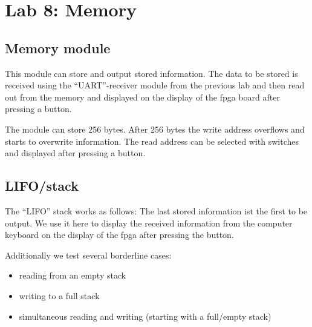 \chapter{Lab 8: Memory} \label{day8}

\section{Memory module}

This module can store and output stored information. The data to be stored is received using the ``UART''-receiver module from the previous lab and then read out from the memory and displayed on the display of the \gls{fpga} board after pressing a button. 

The module can store 256 bytes. After 256 bytes the write address overflows and starts to overwrite information. The read address can be selected with switches and displayed after pressing a button.





\section{LIFO/stack}

The ``LIFO'' stack works as follows: The last stored information ist the first to be output. We use it here to display the received information from the computer keyboard on the display of the \gls{fpga} after pressing the button.





Additionally we test several borderline cases: 

\begin{itemize}
    \item reading from an empty stack
    \item writing to a full stack
    \item simultaneous reading and writing (starting with a full/empty stack)
\end{itemize}

